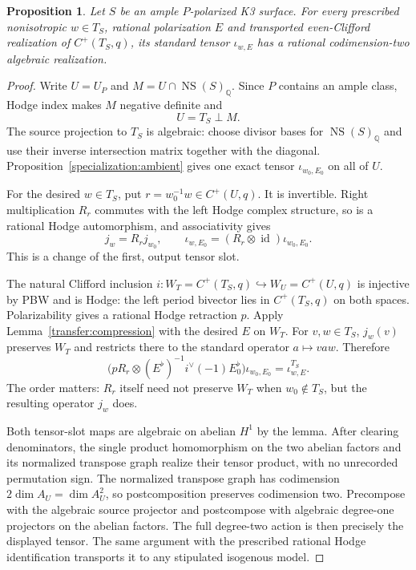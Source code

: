 \documentclass[11pt]{amsart}
\newcommand{\Q}{\mathbb Q}
\DeclareMathOperator{\NS}{NS}
\DeclareMathOperator{\id}{id}
\newtheorem{proposition}[theorem]{Proposition}
\theoremstyle{definition}
\theoremstyle{remark}
\numberwithin{equation}{section}
\begin{document}
\begin{proposition}\label{transfer:ample}
Let $S$ be an ample $P$-polarized K3 surface.  For every prescribed
nonisotropic $w\in T_S$, rational polarization $E$ and transported
even-Clifford realization of $C^+(T_S,q)$, its standard tensor
$\iota_{w,E}$ has a rational codimension-two algebraic realization.
\end{proposition}
\begin{proof}
Write $U=U_P$ and $M=U\cap\NS(S)_{\Q}$.  Since $P$ contains an ample
class, Hodge index makes $M$ negative definite and
\[
 U=T_S\perp M.
\]
The source projection to $T_S$ is algebraic: choose divisor bases
for $\NS(S)_{\Q}$ and use their inverse intersection matrix together
with the diagonal.  Proposition~\ref{specialization:ambient} gives
one exact tensor $\iota_{w_0,E_0}$ on all of $U$.

For the desired $w\in T_S$, put $r=w_0^{-1}w\in C^+(U,q)$.
It is invertible.  Right multiplication $R_r$ commutes with the left
Hodge complex structure, so is a rational Hodge automorphism, and
associativity gives
\[
 j_w=R_rj_{w_0},\qquad
 \iota_{w,E_0}=(R_r\otimes\id)\iota_{w_0,E_0}.
\]
This is a change of the first, output tensor slot.

The natural Clifford inclusion
$i:W_T=C^+(T_S,q)\hookrightarrow W_U=C^+(U,q)$ is injective by PBW
and is Hodge: the left period bivector lies in $C^+(T_S,q)$ on both
spaces.  Polarizability gives a rational Hodge retraction $p$.
Apply Lemma~\ref{transfer:compression} with the desired $E$ on $W_T$.
For $v,w\in T_S$, $j_w(v)$ preserves $W_T$ and restricts there to
the standard operator $a\mapsto vaw$.  Therefore
\[
 \bigl(pR_r\otimes(E^\flat)^{-1}i^\vee(-1)E_0^\flat\bigr)
       \iota_{w_0,E_0}
 =\iota^{T_S}_{w,E}.
\]
The order matters: $R_r$ itself need not preserve $W_T$ when
$w_0\notin T_S$, but the resulting operator $j_w$ does.

Both tensor-slot maps are algebraic on abelian $H^1$ by the lemma.
After clearing denominators, the single product homomorphism on the
two abelian factors and its normalized transpose graph realize their
tensor product, with no unrecorded permutation sign.  The normalized
transpose graph has codimension $2\dim A_U=\dim A_U^2$, so postcomposition
preserves codimension two.  Precompose with the algebraic source projector
and postcompose with algebraic degree-one projectors on the abelian factors.
The full degree-two action is then precisely the displayed tensor.
The same argument with the prescribed rational Hodge identification
transports it to any stipulated isogenous model.
\end{proof}
\end{document}
